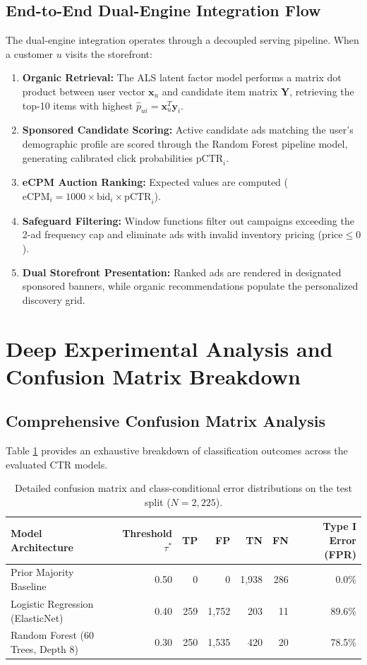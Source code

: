 \documentclass[10pt,a4paper,twoside]{article}
\begin{document}
\subsection{End-to-End Dual-Engine Integration Flow}
The dual-engine integration operates through a decoupled serving pipeline. When a customer $u$ visits the storefront:
\begin{enumerate}
    \item \textbf{Organic Retrieval:} The ALS latent factor model performs a matrix dot product between user vector $\mathbf{x}_u$ and candidate item matrix $\mathbf{Y}$, retrieving the top-10 items with highest $\hat{p}_{ui} = \mathbf{x}_u^T \mathbf{y}_i$.
    \item \textbf{Sponsored Candidate Scoring:} Active candidate ads matching the user's demographic profile are scored through the Random Forest pipeline model, generating calibrated click probabilities $\text{pCTR}_i$.
    \item \textbf{eCPM Auction Ranking:} Expected values are computed ($\text{eCPM}_i = 1000 \times \text{bid}_i \times \text{pCTR}_i$).
    \item \textbf{Safeguard Filtering:} Window functions filter out campaigns exceeding the 2-ad frequency cap and eliminate ads with invalid inventory pricing ($\text{price} \le 0$).
    \item \textbf{Dual Storefront Presentation:} Ranked ads are rendered in designated sponsored banners, while organic recommendations populate the personalized discovery grid.
\end{enumerate}

\section{Deep Experimental Analysis and Confusion Matrix Breakdown}

\subsection{Comprehensive Confusion Matrix Analysis}
Table \ref{tab:confusion_matrices} provides an exhaustive breakdown of classification outcomes across the evaluated CTR models.

\begin{table}[ht]
\centering
\small
\caption{Detailed confusion matrix and class-conditional error distributions on the test split ($N = 2,225$).}
\label{tab:confusion_matrices}
\begin{tabular}{lrrrrrr}
\toprule
\textbf{Model Architecture} & \textbf{Threshold $\tau^*$} & \textbf{TP} & \textbf{FP} & \textbf{TN} & \textbf{FN} & \textbf{Type I Error (FPR)} \\
\midrule
Prior Majority Baseline & 0.50 & 0 & 0 & 1,938 & 286 & 0.0\% \\
Logistic Regression (ElasticNet) & 0.40 & 259 & 1,752 & 203 & 11 & 89.6\% \\
Random Forest (60 Trees, Depth 8) & 0.30 & 250 & 1,535 & 420 & 20 & 78.5\% \\
\bottomrule
\end{tabular}
\end{table}
\end{document}
